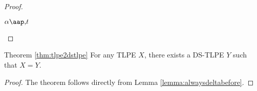 \begin{proof}
\begin{derivation}{$\alpha \at t$}
\end{derivation}
\end{proof}

\begin{proofenv}{Theorem \ref{thm:tlpe2dstlpe}}
For any TLPE $X$, there exists a DS-TLPE $Y$ such that $X = Y$.
\end{proofenv}

\begin{proof}
The theorem follows directly from Lemma \ref{lemma:alwaysdeltabefore}.
\end{proof}

